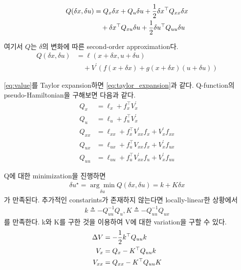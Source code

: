 \documentclass[journal]{IEEEtran}
\begin{document}
	\begin{align}
		\begin{split}
			Q(\delta x,\delta u) & = Q_x\delta x +Q_u \delta u +{1\over2} \delta x^{\top}Q_{xx}\delta x\\
			& \quad +\delta x^{\top}Q_{xu}\delta u+{1 \over 2}\delta u^{\top}Q_{uu}\delta u	
		\end{split}
		\label{eq:Q_second_order_approximation}
	\end{align}
	
	여기서 $Q$는 $\delta$의 변화에 따른 second-order approximation다.
	\begin{align}
		Q(\delta x,\delta u) & =\ell(x+\delta x,u+\delta u)\nonumber\\
		& \quad  +V^{\prime}(f(x+\delta x)+g(x+\delta x)(u+\delta u))
		\label{eq:taylor_expansion}
	\end{align}
	
	\eqref{eq:value}를 Taylor expansion하면 \eqref{eq:taylor_expansion}과 같다. Q-function의 pseudo-Hamiltonian을 구해보면 다음과 같다.
	\begin{subequations}\label{eq:hamitonian}
		\begin{align}
			Q_x&=\ell_x+f_x^{\top}V_x^{\prime}\label{eq:hamitonian_1} \\
			Q_u&=\ell_u+f_u^{\top}V_x^{\prime} \\
			Q_{xx}&=\ell_{xx}+f_x^{\top}V_{xx}^{\prime}f_x+V_x^{\prime}f_{xx}\\
			Q_{ux}&=\ell_{ux}+f_u^{\top}V_{xx}f_x+V_x^{\prime}f_{ux}\\
			Q_{uu}&=\ell_{uu}+f_u^{\top}V_{xx}^{\prime}f_u+V_x^{\prime}f_{uu}
		\end{align}
	\end{subequations}
	
	Q에 대한 minimization을 진행하면
	\begin{align}
		\delta u ^{\star}=\underset{\delta u}{\arg\min} Q(\delta x,\delta u)=k+K\delta x
		\label{eq:delta_u}
	\end{align}
	가 만족된다.
	추가적인 constarints가 존재하지 않는다면 locally-linear한 상황에서
	\begin{align}
		k\triangleq-Q_{uu}^{-1}Q_u,
		K\triangleq-Q_{uu}^{-1}Q_{ux}
		\label{eq:kK}
	\end{align}
	를 만족한다.
	k와 K를 구한 것을 이용하여 V에 대한 variation을 구할 수 있다.
	\begin{align}
		\Delta V&=-{1 \over2}k^{\top}Q_{uu}k\nonumber\\
		V_x&=Q_x-K^{\top}Q_{uu}k\nonumber\\
		V_{xx}&=Q_{xx}-K^{\top}Q_{uu}K
		\label{eq:V_variation}
	\end{align}
	
\end{document}
